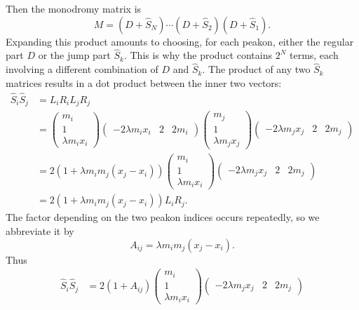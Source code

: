 \documentclass[english,master]{liumaiex}
\theoremstyle{thesisplain}
\theoremstyle{thesisdefinition}
\numberwithin{equation}{section}
\begin{document}
Then the monodromy matrix is
\begin{equation}
	M = (D + \hat{S}_N)\cdots(D + \hat{S}_2)(D + \hat{S}_1).
\end{equation}
Expanding this product amounts to choosing, for each peakon, either the regular part $D$ or the jump part $\hat{S}_k$. This is why the product contains $2^N$ terms, each involving a different combination of $D$ and $\hat{S}_k$.
%
The product of any two $\hat{S}_k$ matrices results in a dot product between the inner two vectors:
\begin{equation}
\begin{aligned}
	\hat{S}_i \hat{S}_{j} &= L_i R_i L_j R_j \\ 
	&=
	\begin{pmatrix}
		m_i \\ 1 \\ \lambda m_i x_i
	\end{pmatrix}
	\begin{pmatrix}
		-2\lambda m_i x_i & 2 & 2 m_i
	\end{pmatrix}
	\begin{pmatrix}
		m_j \\ 1 \\ \lambda m_j x_j
	\end{pmatrix}
	\begin{pmatrix}
		-2\lambda m_j x_j & 2 & 2 m_j
	\end{pmatrix} \\
	&=
	2(1 + \lambda m_i m_j (x_j - x_i))
	\begin{pmatrix}
		m_i \\ 1 \\ \lambda m_i x_i
	\end{pmatrix}
	\begin{pmatrix}
		-2\lambda m_j x_j & 2 & 2 m_j
	\end{pmatrix} \\
	&=
	2(1 + \lambda m_i m_j (x_j - x_i)) L_i R_j.
\end{aligned}
\end{equation}
The factor depending on the two peakon indices occurs repeatedly, so we abbreviate it by
\begin{equation}
	A_{ij} = \lambda m_i m_j (x_j - x_i).
\end{equation}
Thus
\begin{equation}
\begin{aligned}
	\hat{S}_i \hat{S}_{j} &=
	2(1 + A_{ij})
	\begin{pmatrix}
		m_i \\ 1 \\ \lambda m_i x_i
	\end{pmatrix}
	\begin{pmatrix}
		-2\lambda m_j x_j & 2 & 2 m_j
	\end{pmatrix} \\
\end{aligned}
\end{equation}
\end{document}
